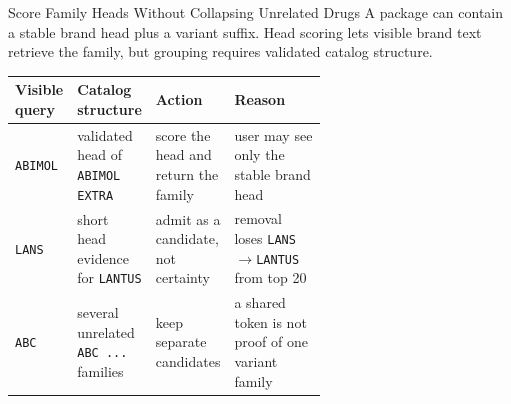 \documentclass[aspectratio=169,10pt]{beamer}
\newcommand{\code}[1]{\texttt{#1}}
\begin{document}
\begin{frame}{Score Family Heads Without Collapsing Unrelated Drugs}
\small
A package can contain a stable brand head plus a variant suffix. Head scoring
lets visible brand text retrieve the family, but grouping requires validated
catalog structure.

\begin{center}
\end{center}

\begin{table}
\centering
\scriptsize
\begin{tabularx}{\linewidth}{@{}L{0.18\linewidth}L{0.25\linewidth}L{0.19\linewidth}Y@{}}
\toprule
\textbf{Visible query} & \textbf{Catalog structure} & \textbf{Action} & \textbf{Reason} \\
\midrule
\code{ABIMOL} & validated head of \code{ABIMOL EXTRA} & score the head and return the family & user may see only the stable brand head \\
\code{LANS} & short head evidence for \code{LANTUS} & admit as a candidate, not certainty & removal loses \code{LANS}$\rightarrow$\code{LANTUS} from top 20 \\
\code{ABC} & several unrelated \code{ABC ...} families & keep separate candidates & a shared token is not proof of one variant family \\
\bottomrule
\end{tabularx}
\end{table}
\end{frame}
\end{document}
